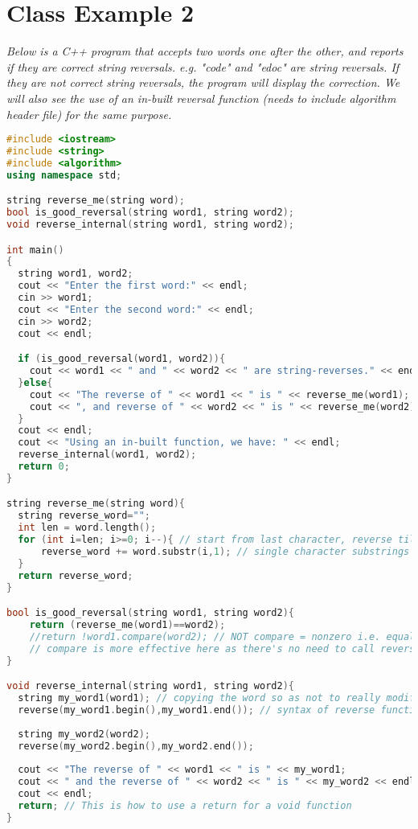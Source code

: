 \documentclass[9pt]{amsart}
\begin{document}
\section{Class Example 2}
\textit{Below is a C++ program that accepts two words one after the other, and reports if they are correct string reversals. e.g. "code" and "edoc" are string reversals. If they are not correct string reversals, the program will display the correction. We will also see the use of an in-built reversal function (needs to include algorithm header file) for the same purpose.}
\begin{lstlisting}[language=C++]
#include <iostream>
#include <string>
#include <algorithm>
using namespace std;

string reverse_me(string word);
bool is_good_reversal(string word1, string word2);
void reverse_internal(string word1, string word2);

int main()
{
  string word1, word2;
  cout << "Enter the first word:" << endl;
  cin >> word1;
  cout << "Enter the second word:" << endl;
  cin >> word2;
  cout << endl;

  if (is_good_reversal(word1, word2)){
    cout << word1 << " and " << word2 << " are string-reverses." << endl;
  }else{
    cout << "The reverse of " << word1 << " is " << reverse_me(word1);
    cout << ", and reverse of " << word2 << " is " << reverse_me(word2) << endl;
  }
  cout << endl;
  cout << "Using an in-built function, we have: " << endl;
  reverse_internal(word1, word2); 
  return 0;  
}

string reverse_me(string word){
  string reverse_word="";
  int len = word.length();
  for (int i=len; i>=0; i--){ // start from last character, reverse till 0
      reverse_word += word.substr(i,1); // single character substrings
  }
  return reverse_word;
}

bool is_good_reversal(string word1, string word2){
    return (reverse_me(word1)==word2);
    //return !word1.compare(word2); // NOT compare = nonzero i.e. equality
    // compare is more effective here as there's no need to call reverse_me
}

void reverse_internal(string word1, string word2){
  string my_word1(word1); // copying the word so as not to really modify it
  reverse(my_word1.begin(),my_word1.end()); // syntax of reverse function
  
  string my_word2(word2);
  reverse(my_word2.begin(),my_word2.end());
  
  cout << "The reverse of " << word1 << " is " << my_word1;
  cout << " and the reverse of " << word2 << " is " << my_word2 << endl;
  cout << endl;
  return; // This is how to use a return for a void function
}
\end{lstlisting}
\end{document}
